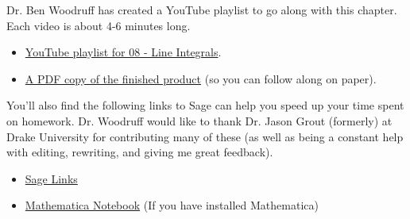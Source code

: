 Dr. Ben Woodruff has created a YouTube playlist to go along with this chapter. Each video is about 4-6 minutes long.
\begin{itemize}
 \item \href{http://www.youtube.com/playlist?list=PL04DF68E73B7ECD54}{YouTube playlist for 08 - Line Integrals}.
 \item \href{http://db.tt/dAFBcMB7}{A PDF copy of the finished product} (so you can follow along on paper).
\end{itemize}
You'll also find the following links to Sage can help you speed up your time spent on homework. Dr. Woodruff would like to thank Dr. Jason Grout (formerly) at Drake University for contributing many of these (as well as being a constant help with editing, rewriting, and giving me great feedback). 
\begin{itemize}
 \item \href{http://bmw.byuimath.com/dokuwiki/doku.php?id=sage_links}{Sage Links}
 \item \href{https://content.byui.edu/file/3e8d885f-db47-4e74-9e04-c3d72627c835/1/_zips/215-Tech-Introduction.zip}{Mathematica Notebook} (If you have installed Mathematica)
\end{itemize}






